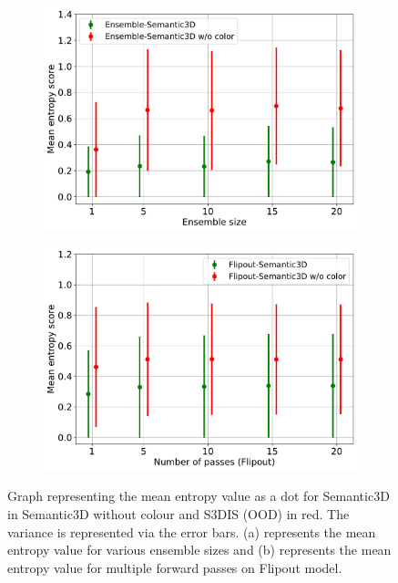     \begin{figure}[h!]
        \centering
        \begin{subfigure}{0.98\textwidth}
            \centering
        \includegraphics[scale=0.4]{images/MSP/Ensembles_ENT_semvsemwoc.pdf}
        \caption{}
        \label{fig:ent_ensembles_ood_2}
        \end{subfigure}    
        \begin{subfigure}{0.98\textwidth}
            \centering
        \includegraphics[scale=0.4]{images/MSP/Flipout_ENT_semvsemwoc.pdf}
        \caption{}
        \label{fig:ent_flipout_ood_2}
        \end{subfigure}
        \caption{Graph representing the mean entropy value as a dot for Semantic3D in Semantic3D without colour and S3DIS (OOD) in red. The variance is represented via the error bars.  (a) represents the mean entropy value for various ensemble sizes and (b) represents the mean entropy value for multiple forward passes on Flipout model.}
    \end{figure}
